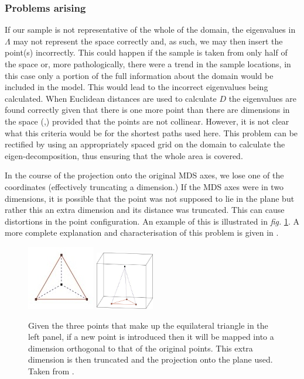 \documentclass[a4paper,10pt]{article}
\newcommand{\fig}[1]{\emph{fig.} \ref{#1}}
\begin{document}
\subsubsection{Problems arising}

If our sample is not representative of the whole of the domain, the eigenvalues in $\Lambda$ may not represent the space correctly and, as such, we may then insert the point(s) incorrectly. This could happen if the sample is taken from only half of the space or, more pathologically, there were a trend in the sample locations, in this case only a portion of the full information about the domain would be included in the model. This would lead to the incorrect eigenvalues being calculated. When Euclidean distances are used to calculate $D$ the eigenvalues are found correctly given that there is one more point than there are dimensions in the space (\cite{landmark},) provided that the points are not collinear. However, it is not clear what this criteria would be for the shortest paths used here. This problem can be rectified by using an appropriately spaced grid on the domain to calculate the eigen-decomposition, thus ensuring that the whole area is covered.

In the course of the projection onto the original MDS axes, we lose one of the coordinates (effectively truncating a dimension.) If the MDS axes were in two dimensions, it is possible that the point was not supposed to lie in the plane but rather this an extra dimension and its distance was truncated. This can cause distortions in the point configuration. An example of this is illustrated in \fig{bojinsert}. A more complete explanation and characterisation of this problem is given in \cite{Boj2009}. 

\begin{figure}
\centering
\includegraphics{figs/boj0.jpg} \includegraphics[width=1in]{figs/boj1.jpg} \\
\caption{Given the three points that make up the equilateral triangle in the left panel, if a new point is introduced then it will be mapped into a dimension orthogonal to that of the original points. This extra dimension is then truncated and the projection onto the plane used. Taken from \cite{Boj2009}.}
\label{bojinsert}
\end{figure}
\end{document}

